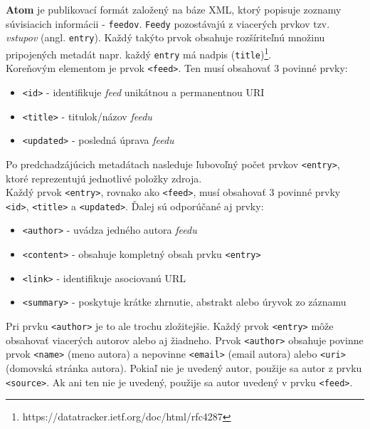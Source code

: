 \documentclass[a4paper, 11pt]{article}
\begin{document}
    \textbf{Atom} je publikovací formát založený na báze XML, ktorý popisuje zoznamy súvisiacich informácii - \texttt{feedov}. \texttt{Feedy} pozostávajú z viacerých prvkov tzv. \textit{vstupov} (angl. \texttt{entry}). Každý takýto prvok obsahuje rozšíriteľnú množinu pripojených metadát napr. každý \texttt{entry} má nadpis (\texttt{title})\footnote{https://datatracker.ietf.org/doc/html/rfc4287}. \\

    Koreňovým elementom je prvok \texttt{<feed>}. Ten musí obsahovať 3 povinné prvky:
    \begin{itemize}
        \item \texttt{<id>} - identifikuje \textit{feed} unikátnou a permanentnou URI \cite{URI}
        \item \texttt{<title>} - titulok/názov \textit{feedu}
        \item \texttt{<updated>} - posledná úprava \textit{feedu}
    \end{itemize}
    Po predchadzájúcich metadátach nasleduje ľubovoľný počet prvkov \texttt{<entry>}, ktoré reprezentujú jednotlivé položky zdroja. \\ 
    
    Každý prvok \texttt{<entry>}, rovnako ako \texttt{<feed>}, musí obsahovať 3 povinné prvky \texttt{<id>}, \texttt{<title>} a \texttt{<updated>}.
    Ďalej sú odporúčané aj prvky: 
    \begin{itemize}
        \item \texttt{<author>} - uvádza jedného autora \textit{feedu}
        \item \texttt{<content>} - obsahuje kompletný obsah prvku \texttt{<entry>}
        \item \texttt{<link>} - identifikuje asociovanú URL
        \item \texttt{<summary>} - poskytuje krátke zhrnutie, abstrakt alebo úryvok zo záznamu
    \end{itemize}
    Pri prvku \texttt{<author>} je to ale trochu zložitejšie. Každý prvok \texttt{<entry>} môže obsahovať viacerých autorov alebo aj žiadneho. Prvok \texttt{<author>} obsahuje povinne prvok \texttt{<name>} (meno autora) a nepovinne \texttt{<email>} (email autora) alebo \texttt{<uri>}(domovská stránka autora). Pokiaľ nie je uvedený autor, použije sa autor z prvku \texttt{<source>}. Ak ani ten nie je uvedený, použije sa autor uvedený v prvku \texttt{<feed>}.
    
\end{document}
